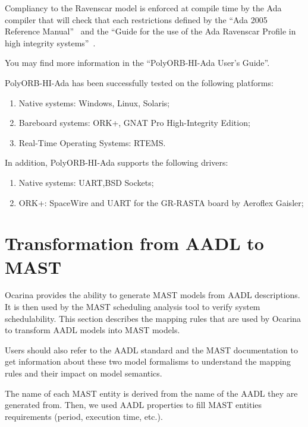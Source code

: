 \documentclass[11pt]{book}
\begin{document}
Compliancy to the Ravenscar model is enforced at compile time by the
 Ada compiler that will check that each restrictions defined by the
 ``Ada 2005 Reference Manual''~\cite{Ada05} and the ``Guide for the
 use of the Ada Ravenscar Profile in high integrity systems''~\cite{HIS05}.

You may find more information in the ``PolyORB-HI-Ada User's Guide''.

PolyORB-HI-Ada has been successfully tested on the following platforms:

\begin{enumerate}
\item Native systems: Windows, Linux, Solaris;
\item Bareboard systems: ORK+, GNAT Pro High-Integrity Edition;
\item Real-Time Operating Systems: RTEMS.
\end {enumerate}

In addition, PolyORB-HI-Ada supports the following drivers:

\begin{enumerate}
\item Native systems: UART,BSD Sockets;
\item ORK+: SpaceWire and UART for the GR-RASTA board by Aeroflex
 Gaisler;
\end {enumerate}


\section{Transformation from AADL to MAST}
\label{section-aadl-mast}
Ocarina provides the ability to generate MAST models from AADL descriptions. It
is then used by the MAST scheduling analysis tool to verify system
schedulability. This section describes the mapping rules that are used by
Ocarina to transform AADL models into MAST models.

Users should also refer to the AADL standard and the MAST documentation to get
information about these two model formalisms to understand the mapping rules
and their impact on model semantics.

The name of each MAST entity is derived from the name of the AADL they are
generated from. Then, we used AADL properties to fill MAST entities requirements
(period, execution time, etc.).

\newpage
\end{document}
